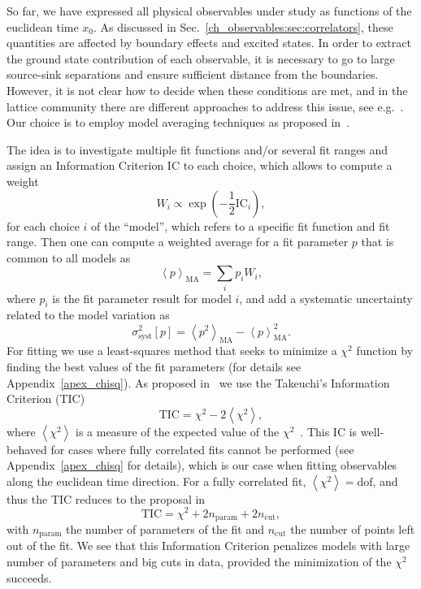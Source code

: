 So far, we have expressed all physical observables under study as functions of the euclidean time $x_0$. As discussed in Sec.~\ref{ch_observables:sec:correlators}, these quantities are affected by boundary effects and excited states. In order to extract the ground state contribution of each observable, it is necessary to go to large source-sink separations and ensure sufficient distance from the boundaries. However, it is not clear how to decide when these conditions are met, and in the lattice community there are different approaches to address this issue, see e.g.~\citep{Strassberger:2023xnj,Bruno:2016plf,RQCD_scale}. Our choice is to employ model averaging techniques as proposed in~\citep{Neil:2022joj,Neil:2023pgt,Frison:2023jbv}.

The idea is to investigate multiple fit functions and/or several fit ranges and assign an Information Criterion ${\textrm{IC}}$ to each choice, which allows to compute a weight
\begin{equation}
\label{ch_observables:eq:weight}
W_i\propto\exp\left(-\frac{1}{2}{\textrm{IC}}_i\right),
\end{equation}
for each choice $i$ of the ``model'', which refers to a specific fit function and fit range. Then one can compute a weighted average for a fit parameter $p$ that is common to all models as
\begin{equation}
\left<{p}\right>_{\textrm{MA}}=\sum_i{p}_iW_i,
\end{equation}
where $p_i$ is the fit parameter result for model $i$, and add a systematic uncertainty related to the model variation as
\begin{equation}
\label{ch_observables:eq:syst}
\sigma_{\textrm{syst}}^2[p]=\left<{p^2}\right>_{\textrm{MA}}-\left<p\right>^2_{\textrm{MA}}.
\end{equation}
For fitting we use a least-squares method that seeks to minimize a $\chi^2$ function by finding the best values of the fit parameters (for details see Appendix~\ref{apex_chisq}). As proposed in~\citep{Frison:2023jbv} we use the Takeuchi's Information Criterion (TIC)
\begin{equation}
\label{ch_observables:eq:TIC}
{\textrm{TIC}}=\chi^2-2\left<\chi^2\right>,
\end{equation}
where $\left<\chi^2\right>$ is a measure of the expected value of the $\chi^2$~\citep{Bruno:2022mfy}. This IC is well-behaved for cases where fully correlated fits cannot be performed (see Appendix~\ref{apex_chisq} for details), which is our case when fitting observables along the euclidean time direction. For a fully correlated fit, $\left<\chi^2\right>={\textrm{dof}}$, and thus the TIC reduces to the proposal in~\citep{Neil:2022joj}
\begin{equation}
{\textrm{TIC}}=\chi^2+2n_{\textrm{param}}+2n_{\textrm{cut}},
\end{equation}
with $n_{\textrm{param}}$ the number of parameters of the fit and $n_{\textrm{cut}}$ the number of points left out of the fit. We see that this Information Criterion penalizes models with large number of parameters and big cuts in data, provided the minimization of the $\chi^2$ succeeds.

